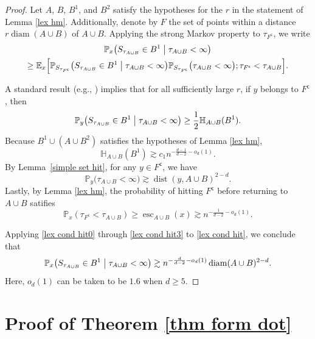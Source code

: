 \documentclass[11pt,reqno]{amsart}
\theoremstyle{definition}
\numberwithin{equation}{section}
\renewcommand{\P}{\mathbb{P}}
\newcommand{\E}{\mathbb{E}}
\newcommand{\1}{\mathbf{1}}
\renewcommand{\H}{\mathbb{H}}
\DeclareMathOperator{\dist}{dist}
\DeclareMathOperator{\diam}{diam}
\newcommand{\cc}{\mathsf{c}}
\DeclareMathOperator{\Es}{esc}
\begin{document}
\begin{proof}
Let $A$, $B$, $B^1$, and $B^2$ satisfy the hypotheses for the $r$ in the statement of Lemma \ref{lex hm}. Additionally, denote by $F$ the set of points within a distance $r \diam (A \cup B)$ of $A \cup B$. Applying the strong Markov property to $\tau_{F^\cc}$, we write
\begin{multline}\label{lex cond hit}
\P_x \big( S_{\tau_{A\cup B}} \in B^1 \bigm\vert \tau_{A \cup B} < \infty \big)\\
 \geq \E_x \Big[ \P_{S_{\tau_{F^\cc}}} \big( S_{\tau_{A \cup B}} \in B^1 \bigm\vert \tau_{A \cup B} < \infty \big) \P_{S_{\tau_{F^\cc}}} \big( \tau_{A \cup B} < \infty \big); \tau_{F^\cc} < \tau_{A \cup B}\Big].
\end{multline}

A standard result (e.g., \cite[Theorem 2.1.3]{lawler2013intersections}) implies that for all sufficiently large $r$, if $y$ belongs to $F^\cc$, then
\begin{equation}\label{lex cond hit0}
\P_y \big( S_{\tau_{A \cup B}} \in B^1 \bigm\vert \tau_{A \cup B} < \infty \big) \geq \frac12 \H_{A \cup B} (B^1).
\end{equation}
Because $B^1 \cup (A \cup B^2)$ satisfies the hypotheses of Lemma \ref{lex hm},
\begin{equation}\label{lex cond hit1}
\H_{A \cup B} (B^1) \gtrsim c_1 n^{-\frac{d-1}{d-2}-o_d(1)}.
\end{equation} 
By Lemma~\ref{simple set hit}, for any $y \in F^\cc$, we have
\begin{equation}\label{lex cond hit2}
\P_y \big( \tau_{A \cup B} < \infty \big) \gtrsim \dist (y,A \cup B)^{2-d}.
\end{equation}
Lastly, by Lemma \ref{lex hm}, the probability of hitting $F^\cc$ before returning to $A \cup B$ satifies
\begin{equation}\label{lex cond hit3}
\P_x (\tau_{F^\cc} < \tau_{A \cup B} ) \geq \Es_{A\cup B} (x) \gtrsim n^{-\frac{1}{d-2} - o_d(1)}.
\end{equation}

Applying \eqref{lex cond hit0} through \eqref{lex cond hit3} to \eqref{lex cond hit}, we conclude that
\[ 
\P_x \big( S_{\tau_{A\cup B}} \in B^1 \bigm\vert \tau_{A \cup B} < \infty \big)
\gtrsim n^{-\frac{d}{d-2}-o_d(1)} \diam (A \cup B)^{2-d}.
\] Here, $o_d(1)$ can be taken to be $1.6$ when $d \geq 5$.
\end{proof}

\section{Proof of Theorem \ref{thm form dot}}\label{sec form dot}
\end{document}
